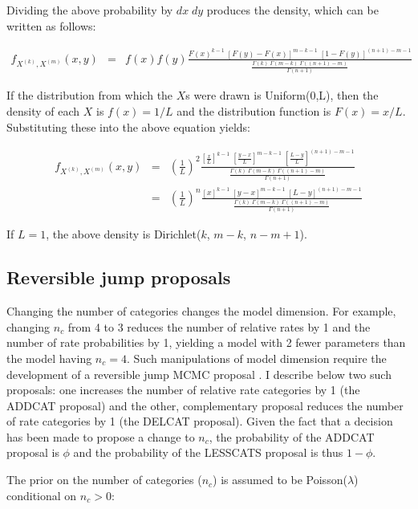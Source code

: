 \documentclass[12pt]{article}
\newcommand{\ncat}{n_c}
\begin{document}
Dividing the above probability by $dx \; dy$ produces the density, which can be written as follows:

\begin{eqnarray*}
f_{X^{(k)}, X^{(m)}}(x,y) & = & f(x) f(y) \frac{F(x)^{k-1} \; \left[ F(y) - F(x) \right]^{m-k-1} \; \left[ 1 - F(y) \right]^{(n+1)-m-1}}{\frac{\Gamma(k) \; \Gamma(m-k) \; \Gamma((n+1)-m)}{\Gamma(n+1)}}
\end{eqnarray*}

If the distribution from which the $X$s were drawn is Uniform(0,L), then the density of each $X$ is $f(x) = 1/L$ and the distribution function is $F(x) = x/L$. Substituting these into the above equation yields:

\begin{eqnarray*}
f_{X^{(k)}, X^{(m)}}(x,y) & = & \left( \frac{1}{L} \right)^2 \frac{\left[ \frac{x}{L} \right]^{k-1} \; \left[ \frac{y-x}{L} \right]^{m-k-1} \; \left[ \frac{L-y}{L} \right]^{(n+1)-m-1}}{\frac{\Gamma(k) \; \Gamma(m-k) \; \Gamma((n+1)-m)}{\Gamma(n+1)}} \\
& = & \left( \frac{1}{L} \right)^n \frac{\left[x\right]^{k-1} \; \left[y-x\right]^{m-k-1} \; \left[L-y\right]^{(n+1)-m-1}}{\frac{\Gamma(k) \; \Gamma(m-k) \; \Gamma((n+1)-m)}{\Gamma(n+1)}}
\end{eqnarray*}

If $L=1$, the above density is Dirichlet($k$, $m-k$, $n-m+1$).

\subsection{Reversible jump proposals}

Changing the number of categories changes the model dimension. For example, changing $\ncat$ from 4 to 3 reduces the number of relative rates by 1 and the number of rate probabilities by 1, yielding a model with 2 fewer parameters than the model having $\ncat = 4$. Such manipulations of model dimension require the development of a reversible jump MCMC proposal \citep{Green1995}. I describe below two such proposals: one increases the number of relative rate categories by 1 (the ADDCAT proposal) and the other, complementary proposal reduces the number of rate categories by 1 (the DELCAT proposal). Given the fact that a decision has been made to propose a change to $\ncat$, the probability of the ADDCAT proposal is $\phi$ and the probability of the LESSCATS proposal is thus $1-\phi$. 

The prior on the number of categories ($\ncat$) is assumed to be Poisson($\lambda$) conditional on $\ncat > 0$:
\end{document}
